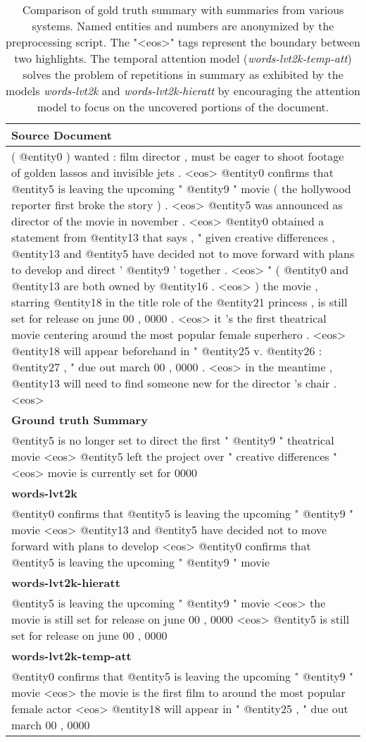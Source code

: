 \begin{table*}[htpb]
\centering
\begin{tabular}{|p{15cm}|}
\hline
{\bf Source Document}\\
\hline
( @entity0 ) wanted : film director , must be eager to shoot footage of golden lassos and invisible jets . <eos> @entity0 confirms that @entity5 is leaving the upcoming " @entity9 " movie ( the hollywood reporter first broke the story ) . <eos> @entity5 was announced as director of the movie in november . <eos> @entity0 obtained a statement from @entity13 that says , " given creative differences , @entity13 and @entity5 have decided not to move forward with plans to develop and direct ' @entity9 ' together . <eos> " ( @entity0 and @entity13 are both owned by @entity16 . <eos> ) the movie , starring @entity18 in the title role of the @entity21 princess , is still set for release on june 00 , 0000 . <eos> it 's the first theatrical movie centering around the most popular female superhero . <eos> @entity18 will appear beforehand in " @entity25 v. @entity26 : @entity27 , " due out march 00 , 0000 . <eos> in the meantime , @entity13 will need to find someone new for the director 's chair . <eos> \\
\hline
{\bf Ground truth Summary}\\
\hline
@entity5 is no longer set to direct the first " @entity9 " theatrical movie <eos> @entity5 left the project over " creative differences " <eos> movie is currently set for 0000 \\
\hline
{\bf words-lvt2k}\\
\hline
@entity0 confirms that @entity5 is leaving the upcoming " @entity9 " movie <eos> @entity13 and @entity5 have decided not to move forward with plans to develop <eos> @entity0 confirms that @entity5 is leaving the upcoming " @entity9 " movie \\
\hline
{\bf words-lvt2k-hieratt}\\
\hline
@entity5 is leaving the upcoming " @entity9 " movie <eos> the movie is still set for release on june 00 , 0000 <eos> @entity5 is still set for release on june 00 , 0000 \\
\hline
{\bf words-lvt2k-temp-att}\\
\hline
@entity0 confirms that @entity5 is leaving the upcoming " @entity9 " movie <eos> the movie is the first film to around the most popular female actor <eos> @entity18 will appear in " @entity25 , " due out march 00 , 0000 \\
\hline
\end{tabular}
\caption{Comparison of gold truth summary with summaries from various systems. Named entities and numbers are anonymized by the preprocessing script. The "<eos>" tags represent the boundary between two highlights. The temporal attention model ({\it words-lvt2k-temp-att}) solves the problem of repetitions in summary as exhibited by the models {\it words-lvt2k} and {\it words-lvt2k-hieratt} by encouraging the attention model to focus on the uncovered portions of the document.}
\label{tab:cnn_example}
\end{table*}

